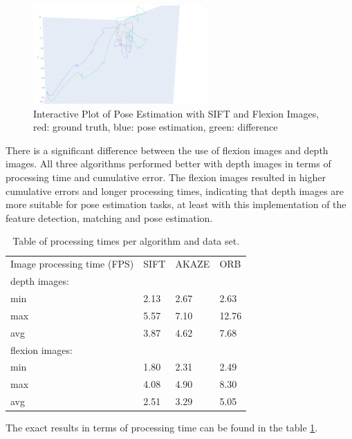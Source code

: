 \documentclass[conference, a4paper]{IEEEtran}
\begin{document}
\begin{figure}[h]
	\centering
	\includegraphics[width=0.6\textwidth]{pics/newplot.png}
	\caption{Interactive Plot of Pose Estimation with SIFT and Flexion Images, red: ground truth, blue: pose estimation, green: difference}
	\label{Pic3}
\end{figure}
There is a significant difference between the use of flexion images and depth images. All three algorithms performed better with depth images in terms of processing time and cumulative error. The flexion images resulted in higher cumulative errors and longer processing times, indicating that depth images are more suitable for pose estimation tasks, at least with this implementation of the feature detection, matching and pose estimation.

\begin{table}[]
	\label{tab1}
	\begin{center}
		\begin{tabular}{llll}
			Image processing time (FPS) & SIFT & AKAZE & ORB   \\
			depth images:               &      &       &       \\
			min                         & 2.13 & 2.67  & 2.63  \\
			max                         & 5.57 & 7.10  & 12.76 \\
			avg                         & 3.87 & 4.62  & 7.68  \\
			flexion images:             &      &       &       \\
			min                         & 1.80 & 2.31  & 2.49  \\
			max                         & 4.08 & 4.90  & 8.30  \\
			avg                         & 2.51 & 3.29  & 5.05 
		\end{tabular}
		\caption{Table of processing times per algorithm and data set.}
	\end{center}
\end{table}
The exact results in terms of processing time can be found in the table \ref{tab1}. 
\end{document}
